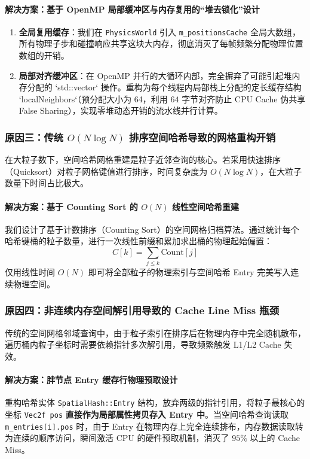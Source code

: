 \documentclass[11pt,a4paper]{article}
\begin{document}
\paragraph{解决方案：基于 OpenMP 局部缓冲区与内存复用的“堆去锁化”设计}
\begin{enumerate}
    \item \textbf{全局复用缓存}：我们在 \texttt{PhysicsWorld} 引入 \texttt{m\_positionsCache} 全局大数组，所有物理子步和碰撞响应共享这块大内存，彻底消灭了每帧频繁分配物理位置数组的开销。
    \item \textbf{局部对齐缓冲区}：在 OpenMP 并行的大循环内部，完全摒弃了可能引起堆内存分配的 `std::vector` 操作。重构为每个线程内局部栈上分配的定长缓存结构 `localNeighbors`（预分配大小为 64，利用 $64$ 字节对齐防止 CPU Cache 伪共享 False Sharing），实现零堆动态开销的流水线并行计算。
\end{enumerate}

\subsubsection{原因三：传统 $O(N \log N)$ 排序空间哈希导致的网格重构开销}
在大粒子数下，空间哈希网格重建是粒子近邻查询的核心。若采用快速排序（Quicksort）对粒子网格键值进行排序，时间复杂度为 $O(N \log N)$，在大粒子数量下时间占比极大。

\paragraph{解决方案：基于 Counting Sort 的 $O(N)$ 线性空间哈希重建}
我们设计了基于计数排序（Counting Sort）的空间网格归档算法。通过统计每个哈希键桶的粒子数量，进行一次线性前缀和累加求出桶的物理起始偏置：
\begin{equation}
C[k] = \sum_{j \le k} \text{Count}[j]
\end{equation}
仅用线性时间 $O(N)$ 即可将全部粒子的物理索引与空间哈希 Entry 完美写入连续物理空间。

\subsubsection{原因四：非连续内存空间解引用导致的 Cache Line Miss 瓶颈}
传统的空间网格邻域查询中，由于粒子索引在排序后在物理内存中完全随机散布，遍历桶内粒子坐标时需要依赖指针多次解引用，导致频繁触发 L1/L2 Cache 失效。

\paragraph{解决方案：胖节点 Entry 缓存行物理预取设计}
重构哈希实体 \texttt{SpatialHash::Entry} 结构，放弃两级的指针引用，将粒子最核心的坐标 \texttt{Vec2f pos} \textbf{直接作为局部属性拷贝存入 Entry 中}。当空间哈希查询读取 \texttt{m\_entries[i].pos} 时，由于 Entry 在物理内存上完全连续排布，内存数据读取转为连续的顺序访问，瞬间激活 CPU 的硬件预取机制，消灭了 $95\%$ 以上的 Cache Miss。
\end{document}
